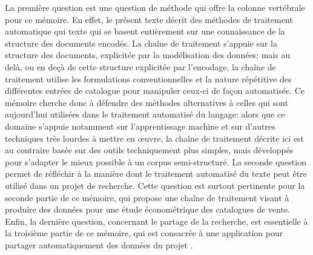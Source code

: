 La première question est une question de méthode qui offre la colonne vertébrale pour ce mémoire. En effet, le présent texte décrit des méthodes de traitement automatique qui texte qui se basent entièrement sur une connaissance de la structure des documents encodés. La chaîne de traitement s'appuie sur la structure des documents, explicitée par la modélisation des données; mais au delà, ou en deçà de cette structure explicitée par l'encodage, la chaîne de traitement utilise les formulations conventionnelles et la nature répétitive des différentes entrées de catalogue pour manipuler ceux-ci de façon automatisée. Ce mémoire cherche donc à défendre des méthodes alternatives à celles qui sont aujourd'hui utilisées dans le traitement automatisé du langage: alors que ce domaine s'appuie notamment sur l'apprentissage machine et sur d'autres techniques très lourdes à mettre en œuvre, la chaîne de traitement décrite ici est au contraire basée sur des outils techniquement plus simples, mais développés pour s'adapter le mieux possible à un corpus semi-structuré. La seconde question permet de réfléchir à la manière dont le traitement automatisé du texte peut être utilisé dans un projet de recherche. Cette question est surtout pertinente pour la seconde partie de ce mémoire, qui propose une chaîne de traitement visant à produire des données pour une étude économétrique des catalogues de vente. Enfin, la dernière question, concernant le partage de la recherche, est essentielle à la troisième partie de ce mémoire, qui est consacrée à une application pour partager automatiquement des données du projet \mssktb{}.

